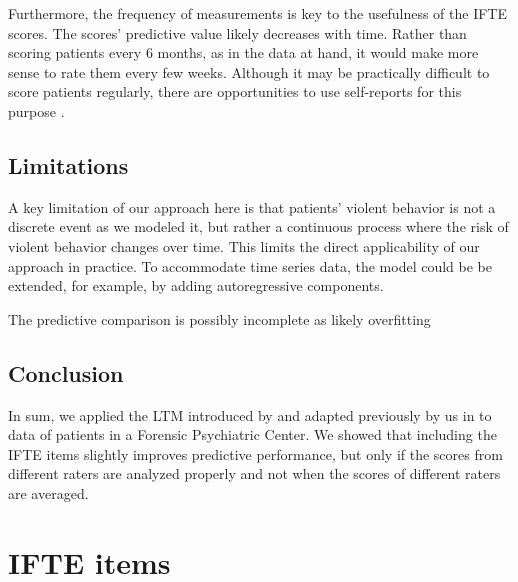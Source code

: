 \documentclass[a4paper,11pt]{article}
\begin{document}
Furthermore, the frequency of measurements is key to the usefulness of the IFTE scores.
The scores' predictive value likely decreases with time.
Rather than scoring patients every 6 months, as in the data at hand, it would make more sense to rate them every few weeks.
Although it may be practically difficult to score patients regularly, there are opportunities to use self-reports for this purpose \parencite{tuente2021mapping, bousardt2016predicting}.

\subsection{Limitations}
A key limitation of our approach here is that patients' violent behavior is not a discrete event as we modeled it, but rather a continuous process where the risk of violent behavior changes over time.
This limits the direct applicability of our approach in practice.
To accommodate time series data, the model could be be extended, for example, by adding autoregressive components.



The predictive comparison is possibly incomplete as  likely overfitting

\subsection{Conclusion}
In sum, we applied the LTM introduced by \textcite{Anders2015cultural} and adapted previously by us in \textcite{vandenBergh2020cultural} to data of patients in a Forensic Psychiatric Center.
We showed that including the IFTE items slightly improves predictive performance, but only if the scores from different raters are analyzed properly and not when the scores of different raters are averaged.



\printbibliography
\newpage

\appendix

\section{IFTE items}
\end{document}
